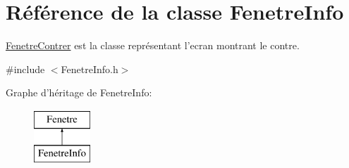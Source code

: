 \hypertarget{classFenetreInfo}{\section{\-Référence de la classe \-Fenetre\-Info}
\label{classFenetreInfo}
}


\hyperlink{classFenetreContrer}{\-Fenetre\-Contrer} est la classe représentant l'ecran montrant le contre.  




{\ttfamily \#include $<$\-Fenetre\-Info.\-h$>$}

\-Graphe d'héritage de \-Fenetre\-Info\-:\begin{figure}[H]
\begin{center}
\leavevmode
\includegraphics[height=2.000000cm]{classFenetreInfo}
\end{center}
\end{figure}
